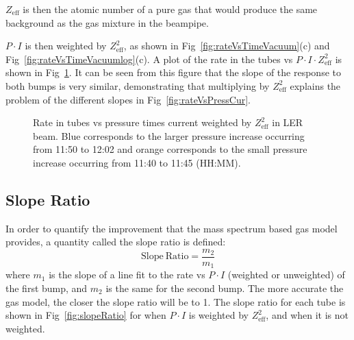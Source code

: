 	$Z_{\mathrm{eff}}$ is then the atomic number of a pure gas that would produce the same background as the gas mixture in the beampipe.


	$P\cdot I$ is then weighted by $Z_{\mathrm{eff}}^2$, as shown in Fig~\ref{fig:rateVsTimeVacuum}(c) and Fig~\ref {fig:rateVsTimeVacuumlog}(c). A plot of the rate in the \he tubes vs $P\cdot I \cdot Z_{\mathrm{eff}}^2$ is shown in Fig~\ref{fig:rateVsPressCurWeight}. It can be seen from this figure that the slope of the response to both bumps is very similar, demonstrating that multiplying by $Z_{\mathrm{eff}}^2$ explains the problem of the different slopes in Fig~\ref{fig:rateVsPressCur}.


\begin{figure}
	\centering
	\caption[Rate in \he tubes vs pressure times current weighted by $Z_{\mathrm{eff}}^2$ in LER beam]{Rate in \he tubes vs pressure times current weighted by $Z_{\mathrm{eff}}^2$ in LER beam. Blue corresponds to  the larger pressure increase occurring from 11:50 to 12:02 and orange corresponds to the small pressure increase occurring from 11:40 to 11:45 (HH:MM).}	
	\label{fig:rateVsPressCurWeight}
\end{figure}


\subsection{Slope Ratio}

	In order to quantify the improvement that the mass spectrum based gas model provides, a quantity called the slope ratio is defined:
\begin{equation}
	{\mathrm{Slope~Ratio} = \frac{m_{2}}{m_{1}}}
\end{equation}
where $m_{1}$ is the slope of a line fit to the rate vs $P\cdot I$ (weighted or unweighted) of the first bump, and $m_{2}$ is the same for the second bump. The more accurate the gas model, the closer the slope ratio will be to 1. The slope ratio for each \he tube is shown in Fig~\ref{fig:slopeRatio} for when $P\cdot I$ is weighted by $Z_{\mathrm{eff}}^2$, and when it is not weighted.


